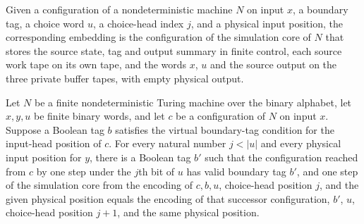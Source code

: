 \begin{definition}
\label{Complexity.choiceCoreCfg}
\leanok
{}
Given a configuration of a nondeterministic machine $N$ on input $x$, a boundary tag, a choice word $u$, a choice-head index $j$, and a physical input position, the corresponding embedding is the configuration of the simulation core of $N$ that stores the source state, tag and output summary in finite control, each source work tape on its own tape, and the words $x$, $u$ and the source output on the three private buffer tapes, with empty physical output.
\end{definition}

\begin{lemma}
\label{Complexity.choiceCore_step}
\leanok
{}
Let $N$ be a finite nondeterministic Turing machine over the binary alphabet, let
$x,y,u$ be finite binary words, and let $c$ be a configuration of $N$ on input $x$.
Suppose a Boolean tag $b$ satisfies the virtual boundary-tag condition for the
input-head position of $c$. For every natural number $j<|u|$ and every physical input
position for $y$, there is a Boolean tag $b'$ such that the configuration reached from
$c$ by one step under the $j$th bit of $u$ has valid boundary tag $b'$, and one step of
the simulation core from the encoding of $c,b,u$, choice-head position $j$, and the
given physical position equals the encoding of that successor configuration, $b'$, $u$,
choice-head position $j+1$, and the same physical position.
\end{lemma}

